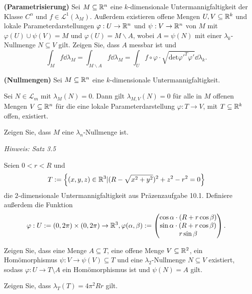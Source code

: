 \begin{Problem}
	\textbf{(Parametrisierung)} Sei $M\subseteq \mathbb{R}^n$ eine $k$-dimensionale Untermannigfaltigkeit der Klasse $C^\alpha$ und $f\in \mathcal{L}^1(\lambda_M)$. Außerdem existieren offene Mengen $U,V\subseteq \mathbb{R}^k$ und lokale Parameterdarstellungen $\varphi:U\to \mathbb{R}^n$ und $\psi:V\to\mathbb{R}^n$ von $M$ mit $\varphi(U)\cup \psi(V)=M$ und $\varphi(U)=M\backslash A$, wobei $A=\psi(N)$ mit einer $\lambda_k$-Nullmenge $N\subseteq V$ gilt. Zeigen Sie, dass $A$ messbar ist und
          \[
		\int_M f\dd{\lambda_M}=\int_{M\backslash A} f\dd{\lambda_M}=\int_U f\circ \varphi \cdot \sqrt{\text{det}\varphi'^T\varphi'} \dd{\lambda_k}
	.\] 
\end{Problem}

\begin{Problem}
	\textbf{(Nullmengen)} Sei $M\subseteq \mathbb{R}^n$ eine $k$-dimensionale Untermannigfaltigkeit.
	\begin{parts}
		\item Sei $N\in \mathcal{L}_m$ mit $\lambda_M(N)=0$. Dann gilt $\lambda_{M,V}(N)=0$ f\"{u}r alle in $M$ offenen Mengen $V\subseteq \mathbb{R}^n$ f\"{u}r die eine lokale Parameterdarstellung $\varphi:T\to V$, mit $T\subseteq \mathbb{R}^k$ offen, existiert.
		\item Zeigen Sie, dass $M$ eine $\lambda_n$-Nullmenge ist.
			
			{\footnotesize \emph{Hinweis: Satz 3.5}}
	\end{parts}
\end{Problem}

\begin{Problem}
	Seien $0<r<R$ und
	\[
	T:=\left\{ (x,y,z)\in \mathbb{R}^3|(R-\sqrt{x^2+y^2})^2+z^2-r^2=0 \right\} 
\]
die $2$-dimensionale Untermannigfaltigkeit aus Präzenzaufgabe 10.1. Definiere außerdem die Funktion
\[
\varphi:U:=(0,2\pi)\times (0,2\pi)\to \mathbb{R}^3,\varphi(\alpha,\beta):=\begin{pmatrix} \cos\alpha \cdot (R+r\cos\beta)\\ \sin\alpha \cdot (R+r\cos\beta) \\ r\sin\beta \end{pmatrix} 
.\] 
\begin{parts}
\item Zeigen Sie, dass eine Menge $A\subseteq T$, eine offene Menge $V\subseteq \mathbb{R}^2$, ein Homömorphismus $\psi:V\to \psi(V)\subseteq T$ und eine $\lambda_2$-Nullmenge $N\subseteq V$ existiert, sodass $\varphi:U\to T\setminus A$ ein Homömorphismus ist und $\psi(N)=A$ gilt.
\item Zeigen Sie, dass $\lambda_T(T)=4\pi^2 Rr$ gilt.
\end{parts}
\end{Problem}
